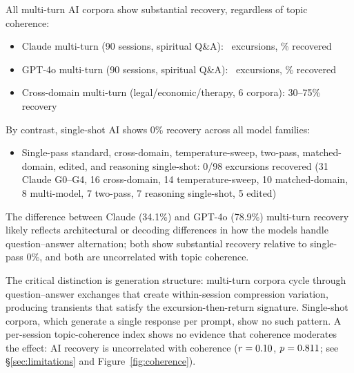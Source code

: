 \documentclass[final]{clv2025}
\begin{document}
All multi-turn AI corpora show substantial recovery, regardless of topic coherence:
\begin{itemize}
\item Claude multi-turn (90 sessions, spiritual Q\&A): \excMTClaude\ excursions, \recClaudeMT\% recovered
\item GPT-4o multi-turn (90 sessions, spiritual Q\&A): \excMTGPT\ excursions, \recGPTMT\% recovered
\item Cross-domain multi-turn (legal/economic/therapy, 6 corpora): 30--75\% recovery
\end{itemize}

By contrast, single-shot AI shows 0\% recovery across all model families:
\begin{itemize}
\item Single-pass standard, cross-domain, temperature-sweep, two-pass, matched-domain, edited, and reasoning single-shot: 0/98 excursions recovered (31 Claude G0--G4, 16 cross-domain, 14 temperature-sweep, 10 matched-domain, 8 multi-model, 7 two-pass, 7 reasoning single-shot, 5 edited)
\end{itemize}

The difference between Claude (34.1\%) and GPT-4o (78.9\%) multi-turn recovery likely reflects architectural or decoding differences in how the models handle question--answer alternation; both show substantial recovery relative to single-pass 0\%, and both are uncorrelated with topic coherence.

The critical distinction is generation structure: multi-turn corpora cycle through question--answer exchanges that create within-session compression variation, producing transients that satisfy the excursion-then-return signature. Single-shot corpora, which generate a single response per prompt, show no such pattern. A per-session topic-coherence index shows no evidence that coherence moderates the effect: AI recovery is uncorrelated with coherence ($r = 0.10$, $p = 0.811$; see \S\ref{sec:limitations} and Figure~\ref{fig:coherence}).
\end{document}
